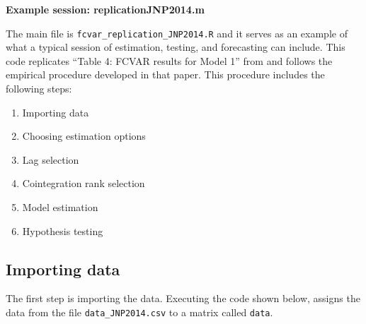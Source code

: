 \documentclass[article]{jss}
\begin{document}
\textbf{Example session: replicationJNP2014.m}

The main file is \verb|fcvar_replication_JNP2014.R| and it serves as an example of what a typical session of estimation, testing, and forecasting can include. This code replicates ``Table 4: FCVAR results for Model 1'' from \cite{JNP2014} and follows the empirical procedure developed in that paper. This procedure includes the following steps:

\begin{enumerate}
\item Importing data
\item Choosing estimation options
\item Lag selection
\item Cointegration rank selection
\item Model estimation
\item Hypothesis testing
\end{enumerate}

% 

% 


\subsection{Importing data}

The first step is importing the data. Executing the code 
shown below, assigns the data from the file \verb|data_JNP2014.csv| to a matrix called \verb|data|. 
\end{document}

